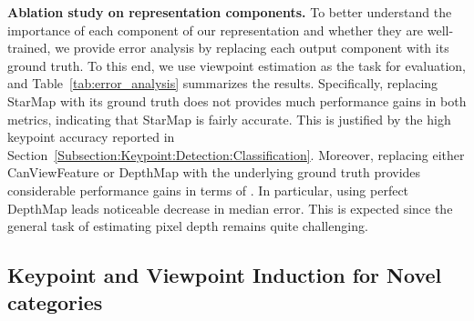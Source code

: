 \documentclass[runningheads]{llncs}
\begin{document}
\noindent\textbf{Ablation study on representation components.} To better understand the importance of each component of our representation and whether they are well-trained, we provide error analysis by replacing each output component with its ground truth. To this end, we use viewpoint estimation as the task for evaluation, and Table~\ref{tab:error_analysis} summarizes the results. 
Specifically, replacing {StarMap} with its ground truth does not provides much performance gains in both metrics, indicating that {StarMap} is fairly accurate. 
This is justified by the high keypoint accuracy reported in  Section~\ref{Subsection:Keypoint:Detection:Classification}. 
Moreover, replacing either {CanViewFeature} or {DepthMap} with the underlying ground truth provides considerable performance gains in terms of . 
In particular, using perfect {DepthMap} leads noticeable decrease in median error. 
This is expected since the general task of estimating pixel depth remains quite challenging.  


\subsection{Keypoint and Viewpoint Induction for Novel categories}
\label{Subsection:PoseInduction}

\begin{table}[t]
\scriptsize
{}
{\caption{Viewpoint estimation for novel categories results on ObjectNet3D+~\cite{xiang2016objectnet3d}. We shown our results in . }
\label{table:objectNet3D}}
\end{table}
\end{document}
